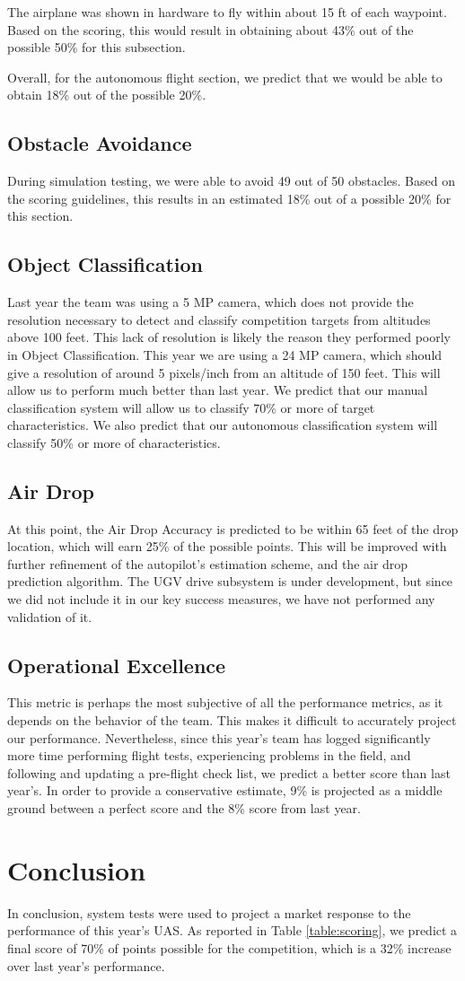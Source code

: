 \documentclass[]{auvsi_doc}
\begin{document}
The airplane was shown in hardware to fly within about 15 ft of each waypoint. Based on the scoring, this would result in obtaining about 43\% out of the possible 50\% for this subsection.

Overall, for the autonomous flight section, we predict that we would be able to obtain 18\% out of the possible 20\%.

\subsection{Obstacle Avoidance}

During simulation testing, we were able to avoid 49 out of 50 obstacles. Based on the scoring guidelines, this results in an estimated 18\% out of a possible 20\% for this section.

\subsection{Object Classification}

Last year the team was using a 5 MP camera, which does not provide the resolution necessary to detect and classify competition targets from altitudes above 100 feet. This lack of resolution is likely the reason they performed poorly in Object Classification. This year we are using a 24 MP camera, which should give a resolution of around 5 pixels/inch from an altitude of 150 feet. This will allow us to perform much better than last year. We predict that our manual classification system will allow us to classify 70\% or more of target characteristics. We also predict that our autonomous classification system will classify 50\% or more of characteristics.

\subsection{Air Drop}
At this point, the Air Drop Accuracy is predicted to be within 65 feet of the drop location, which will earn 25\% of the possible points. This will be improved with further refinement of the autopilot's estimation scheme, and the air drop prediction algorithm. The UGV drive subsystem is under development, but since we did not include it in our key success measures, we have not performed any validation of it.

\subsection{Operational Excellence}
This metric is perhaps the most subjective of all the performance metrics, as it depends on the behavior of the team. This makes it difficult to accurately project our performance. Nevertheless, since this year's team has logged significantly more time performing flight tests, experiencing problems in the field, and following and updating a pre-flight check list, we predict a better score than last year's. In order to provide a conservative estimate, 9\% is projected as a middle ground between a perfect score and the 8\% score from last year.

\section{Conclusion}
In conclusion, system tests were used to project a market response to the performance of this year's UAS. As reported in Table \ref{table:scoring}, we predict a final score of 70\% of points possible for the competition, which is a 32\% increase over last year's performance.
\end{document}
